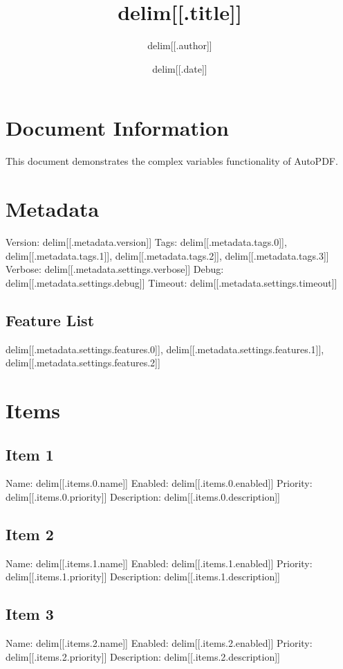 \documentclass{article}
\title{delim[[.title]]}
\author{delim[[.author]]}
\date{delim[[.date]]}
\begin{document}
\maketitle

\section{Document Information}
This document demonstrates the complex variables functionality of AutoPDF.

\section{Metadata}
Version: delim[[.metadata.version]]
Tags: delim[[.metadata.tags.0]], delim[[.metadata.tags.1]], delim[[.metadata.tags.2]], delim[[.metadata.tags.3]]
Verbose: delim[[.metadata.settings.verbose]]
Debug: delim[[.metadata.settings.debug]]
Timeout: delim[[.metadata.settings.timeout]]

\subsection{Feature List}
delim[[.metadata.settings.features.0]], delim[[.metadata.settings.features.1]], delim[[.metadata.settings.features.2]]

\section{Items}
\subsection{Item 1}
Name: delim[[.items.0.name]]
Enabled: delim[[.items.0.enabled]]
Priority: delim[[.items.0.priority]]
Description: delim[[.items.0.description]]

\subsection{Item 2}
Name: delim[[.items.1.name]]
Enabled: delim[[.items.1.enabled]]
Priority: delim[[.items.1.priority]]
Description: delim[[.items.1.description]]

\subsection{Item 3}
Name: delim[[.items.2.name]]
Enabled: delim[[.items.2.enabled]]
Priority: delim[[.items.2.priority]]
Description: delim[[.items.2.description]]
\end{document}
